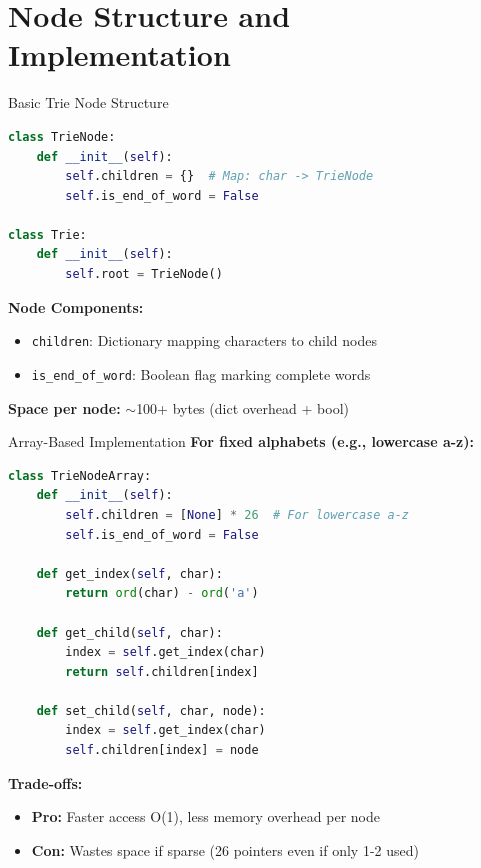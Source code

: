 \documentclass[aspectratio=169]{beamer}
\begin{document}
\section{Node Structure and Implementation}

\begin{frame}[fragile]{Basic Trie Node Structure}
  \begin{lstlisting}[language=Python, basicstyle=\ttfamily\small]
class TrieNode:
    def __init__(self):
        self.children = {}  # Map: char -> TrieNode
        self.is_end_of_word = False

class Trie:
    def __init__(self):
        self.root = TrieNode()
  \end{lstlisting}

  \vspace{0.3cm}
  \textbf{Node Components:}
  \begin{itemize}
    \item \texttt{children}: Dictionary mapping characters to child nodes
    \item \texttt{is\_end\_of\_word}: Boolean flag marking complete words
  \end{itemize}

  \vspace{0.3cm}
  \textbf{Space per node:} $\sim$100+ bytes (dict overhead + bool)
\end{frame}

\begin{frame}[fragile]{Array-Based Implementation}
  \textbf{For fixed alphabets (e.g., lowercase a-z):}

  \begin{lstlisting}[language=Python, basicstyle=\ttfamily\small]
class TrieNodeArray:
    def __init__(self):
        self.children = [None] * 26  # For lowercase a-z
        self.is_end_of_word = False

    def get_index(self, char):
        return ord(char) - ord('a')

    def get_child(self, char):
        index = self.get_index(char)
        return self.children[index]

    def set_child(self, char, node):
        index = self.get_index(char)
        self.children[index] = node
  \end{lstlisting}

  \vspace{0.3cm}
  \textbf{Trade-offs:}
  \begin{itemize}
    \item \textbf{Pro:} Faster access O(1), less memory overhead per node
    \item \textbf{Con:} Wastes space if sparse (26 pointers even if only 1-2 used)
  \end{itemize}
\end{frame}
\end{document}
